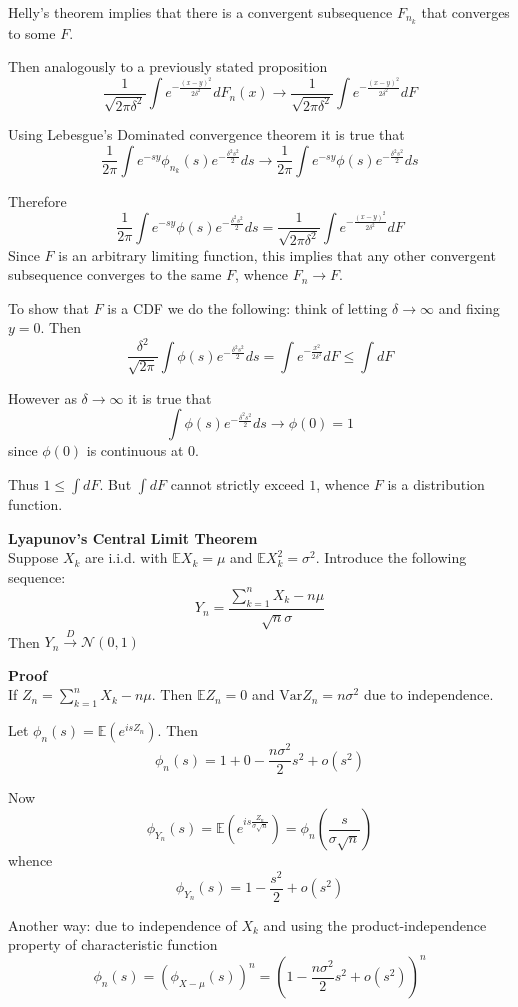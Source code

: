\documentclass[a4paper]{article}
\newcommand{\brac}[1]{{\left ( #1 \right )}}
\newcommand{\ex}{\mathbb{E}}
\newcommand{\Var}{\text{Var}}
\begin{document}
Helly's theorem implies that there is a convergent subsequence $F_{n_k}$ that converges to some $F$.

Then analogously to a previously stated proposition
\[\frac{1}{\sqrt{2\pi\delta^2}}\int e^{-\frac{{(x-y)}^2}{2\delta^2}}dF_n(x)
\to \frac{1}{\sqrt{2\pi\delta^2}}\int e^{-\frac{{(x-y)}^2}{2\delta^2}}dF\]

Using Lebesgue's Dominated convergence theorem it is true that
\[\frac{1}{2\pi}\int e^{-sy} \phi_{n_k}(s) e^{-\frac{\delta^2 s^2}{2}}ds
\to \frac{1}{2\pi}\int e^{-sy} \phi(s) e^{-\frac{\delta^2 s^2}{2}}ds\]

Therefore
\[\frac{1}{2\pi}\int e^{-sy} \phi(s) e^{-\frac{\delta^2 s^2}{2}}ds
= \frac{1}{\sqrt{2\pi\delta^2}}\int e^{-\frac{{(x-y)}^2}{2\delta^2}}dF\]
Since $F$ is an arbitrary limiting function, this implies that any other convergent subsequence converges to the same $F$, whence $F_n\to F$.

To show that $F$ is a CDF we do the following: think of letting $\delta\to \infty$ and fixing $y=0$. Then
\[\frac{\delta^2}{\sqrt{2\pi}}\int \phi(s) e^{-\frac{\delta^2 s^2}{2}}ds
= \int e^{-\frac{x^2}{2\delta^2}}dF \leq \int dF\]

However as $\delta\to\infty$ it is true that
\[\int \phi(s) e^{-\frac{\delta^2 s^2}{2}}ds\to \phi(0) = 1\]
since $\phi(0)$ is continuous at $0$.

Thus $1 \leq \int dF$. But $\int dF$ cannot strictly exceed $1$, whence $F$ is a distribution function.

\noindent\textbf{Lyapunov's Central Limit Theorem} \hfill\\
Suppose $X_k$ are i.i.d. with $\ex X_k = \mu$ and $\ex X_k^2 = \sigma^2$. Introduce the following sequence:
\[Y_n = \frac{\sum_{k=1}^n X_k - n \mu }{\sqrt{n}\sigma}\]
Then $Y_n\overset{D}{\to}\mathcal{N}(0,1)$

\textbf{Proof}\hfill\\

If $Z_n = \sum_{k=1}^n X_k - n\mu$. Then $\ex Z_n = 0$ and $\Var Z_n = n \sigma^2$ due to independence.

Let $\phi_n(s) = \ex\brac{e^{isZ_n}}$. Then
\[\phi_n(s) = 1 + 0 - \frac{n\sigma^2}{2} s^2 + o(s^2)\]

Now
\[\phi_{Y_n}(s) = \ex\brac{e^{is\frac{Z_n}{\sigma \sqrt{n}}}} = \phi_n(\frac{s}{\sigma\sqrt{n}})\]
whence
\[\phi_{Y_n}(s) = 1 - \frac{s^2}{2} + o(s^2)\]


Another way: due to independence of $X_k$ and using the product-independence property of characteristic function
\[\phi_n(s) = \brac{\phi_{X-\mu}(s)}^n = \brac{ 1 - \frac{n\sigma^2}{2} s^2 + o(s^2) }^n\]
\end{document}
